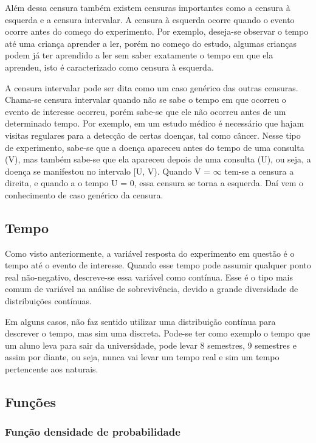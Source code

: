 \documentclass[12pt,a4paper]{article}
\begin{document}
Além dessa censura também existem censuras importantes como a censura à esquerda e a censura intervalar. A censura à esquerda ocorre quando o evento ocorre antes do começo do experimento. Por exemplo, deseja-se observar o tempo até uma criança aprender a ler, porém no começo do estudo, algumas crianças podem já ter aprendido a ler sem saber exatamente o tempo em que ela aprendeu, isto é caracterizado como censura à esquerda. %

A censura intervalar pode ser dita como um caso genérico das outras censuras. Chama-se censura intervalar quando não se sabe o tempo em que ocorreu o evento de interesse
ocorreu, porém sabe-se que ele não ocorreu antes de um determinado tempo. Por exemplo, em um estudo médico é necessário que hajam visitas regulares para a detecção de certas doenças, tal como câncer. Nesse tipo de experimento, sabe-se que a doença apareceu antes do tempo de uma consulta (V), mas também sabe-se que ela apareceu depois de uma consulta (U), ou seja, a doença se manifestou no intervalo [U, V). Quando V = $\infty$
tem-se a censura a direita, e quando a o tempo U = 0, essa censura se torna a esquerda. Daí vem o conhecimento de caso genérico da censura.

\subsection{Tempo}

Como visto anteriormente, a variável resposta do experimento em questão é o tempo até o evento de interesse. Quando esse tempo pode assumir qualquer ponto real não-negativo, descreve-se essa variável como contínua. Esse é o tipo mais comum de variável na análise de sobrevivência, devido a grande diversidade de distribuições contínuas. %

Em alguns casos, não faz sentido utilizar uma distribuição contínua para descrever o tempo, mas sim uma discreta. Pode-se ter como exemplo o tempo que um aluno leva para sair da universidade, pode levar 8 semestres, 9 semestres e assim por diante, ou seja, nunca vai levar um tempo real e sim um tempo pertencente aos naturais.%

\subsection{Funções}

\subsubsection{Função densidade de probabilidade}
\end{document}

